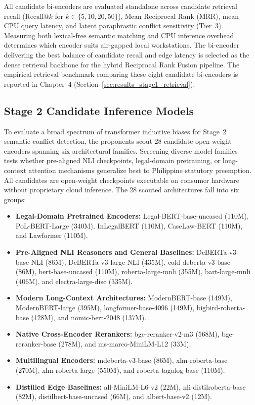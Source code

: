     All candidate bi-encoders are evaluated standalone across candidate retrieval recall ($\text{Recall@}k$ for $k \in \{5, 10, 20, 50\}$), Mean Reciprocal Rank ($\text{MRR}$), mean CPU query latency, and latent paraphrastic conflict sensitivity (Tier~3). Measuring both lexical-free semantic matching and CPU inference overhead determines which encoder suits air-gapped local workstations. The bi-encoder delivering the best balance of candidate recall and edge latency is selected as the dense retrieval backbone for the hybrid Reciprocal Rank Fusion pipeline. The empirical retrieval benchmark comparing these eight candidate bi-encoders is reported in Chapter~4 (Section~\ref{sec:results_stage1_retrieval}).

    \subsection{Stage 2 Candidate Inference Models}
    \label{sec:candidate_model_screening_process}
    \label{sec:stage2_candidate_pool}
    \label{sec:two_step_screening_protocol}
    \label{sec:shortlisting_criteria}
    To evaluate a broad spectrum of transformer inductive biases for Stage~2 semantic conflict detection, the proponents scout 28 candidate open-weight encoders spanning six architectural families. Screening diverse model families tests whether pre-aligned NLI checkpoints, legal-domain pretraining, or long-context attention mechanisms generalize best to Philippine statutory preemption. All candidates are open-weight checkpoints executable on consumer hardware without proprietary cloud inference. The 28 scouted architectures fall into six groups:
    \begin{itemize}\sloppy
        \item \textbf{Legal-Domain Pretrained Encoders:} Legal-BERT-base-uncased (110M), PoL-BERT-Large (340M), InLegalBERT (110M), CaseLaw-BERT (110M), and Lawformer (110M).
        \item \textbf{Pre-Aligned NLI Reasoners and General Baselines:} DeBERTa-v3-base-NLI (86M), DeBERTa-v3-large-NLI (435M), cold deberta-v3-base (86M), bert-base-uncased (110M), roberta-large-mnli (355M), bart-large-mnli (406M), and electra-large-disc (335M).
        \item \textbf{Modern Long-Context Architectures:} ModernBERT-base (149M), ModernBERT-large (395M), longformer-base-4096 (149M), bigbird-roberta-base (128M), and nomic-bert-2048 (137M).
        \item \textbf{Native Cross-Encoder Rerankers:} bge-reranker-v2-m3 (568M), bge-reranker-base (278M), and ms-marco-MiniLM-L12 (33M).
        \item \textbf{Multilingual Encoders:} mdeberta-v3-base (86M), xlm-roberta-base (270M), xlm-roberta-large (550M), and roberta-tagalog-base (110M).
        \item \textbf{Distilled Edge Baselines:} all-MiniLM-L6-v2 (22M), nli-distilroberta-base (82M), distilbert-base-uncased (66M), and albert-base-v2 (12M).
    \end{itemize}

